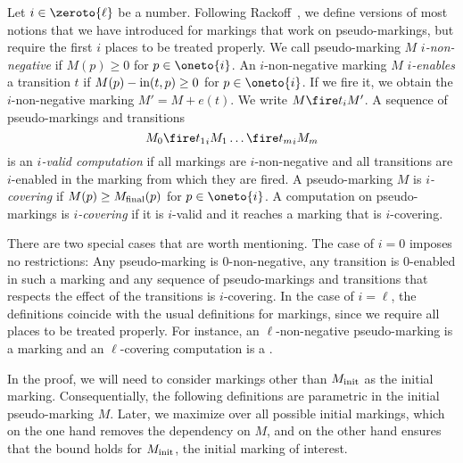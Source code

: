 \documentclass[../../diss.tex]{subfiles}
\begin{document}
Let $i \in \zeroto{\ell}$ be a number.
Following Rackoff~\cite{Rackoff78}, we define versions of most notions that we have introduced for markings that work on pseudo-markings, but require the first $i$ places to be treated properly.
We call pseudo-marking $M$ \emph{$i$-non-negative} if $M(p) \geq 0$ for $p \in \oneto{i}$.
An $i$-non-negative marking $M$ \emph{$i$-enables} a transition $t$ if $M(p) - \text{in}(t,p) \geq 0$ for $p \in \oneto{i}$.
If we fire it, we obtain the $i$-non-negative marking $M' = M + e(t)$.
We write $M \firei{t} M'$.
A sequence of pseudo-markings and transitions
\[
    M_0 \firei{t_1} M_1\ldots \firei{t_m} M_m
\]
is an \emph{$i$-valid computation} if all markings are $i$-non-negative and all transitions are $i$-enabled in the marking from which they are fired.
A pseudo-marking $M$ is \emph{$i$-covering} if $M(p) \geq M_{\text{final}}(p)$ for $p \in \oneto{i}$.
A computation on pseudo-markings is \emph{$i$-covering} if it is $i$-valid and it reaches a marking that is $i$-covering.

There are two special cases that are worth mentioning.
The case of $i = 0$ imposes no restrictions: Any pseudo-marking is $0$-non-negative, any transition is $0$-enabled in such a marking and any sequence of pseudo-markings and transitions that respects the effect of the transitions is $i$-covering.
In the case of $i = \ell$, the definitions coincide with the usual definitions for markings, since we require all places to be treated properly.
For instance, an $\ell$-non-negative pseudo-marking is a marking and an $\ell$-covering computation is a .

In the proof, we will need to consider markings other than $M_{\text{init}}$ as the initial marking.
Consequentially, the following definitions are parametric in the initial pseudo-marking $M$.
Later, we maximize over all possible initial markings, which on the one hand removes the dependency on $M$, and on the other hand ensures that the bound holds for $M_{\text{init}}$, the initial marking of interest.
\end{document}
